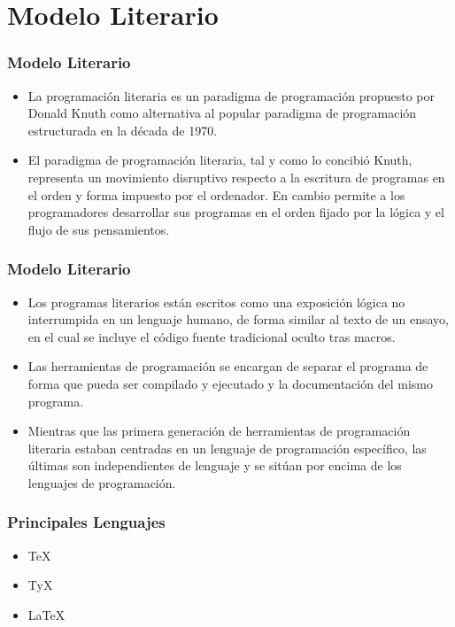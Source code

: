 \documentclass[aspectratio=43]{beamer}%
\begin{document}
\section{Modelo Literario}
\begin{frame}[fragile]
\frametitle{\textbf{Modelo Literario}}
\justifying
 \begin{itemize}\justifying
  \item La programación literaria es un paradigma de programación propuesto por Donald Knuth como alternativa al popular paradigma de programación estructurada en la década de 1970.
  \item El paradigma de programación literaria, tal y como lo concibió Knuth, representa un movimiento disruptivo respecto a la escritura de programas en el orden y forma impuesto por el ordenador. En cambio permite a los programadores desarrollar sus programas en el orden fijado por la lógica y el flujo de sus pensamientos.
\end{itemize}
\end{frame}


\begin{frame}[fragile]
\frametitle{\textbf{Modelo Literario}}
\justifying
\begin{itemize}\justifying
  \item  Los programas literarios están escritos como una exposición lógica no interrumpida en un lenguaje humano, de forma similar al texto de un ensayo, en el cual se incluye el código fuente tradicional oculto tras macros. 
  \item Las herramientas de programación se encargan de separar el programa de forma que pueda ser compilado y ejecutado y la documentación del mismo programa. 
  \item Mientras que las primera generación de herramientas de programación literaria estaban centradas en un lenguaje de programación específico, las últimas son independientes de lenguaje y se sitúan por encima de los lenguajes de programación.
\end{itemize}


\end{frame}

\begin{frame}[fragile]
\frametitle{\textbf{Principales Lenguajes}}
\justifying
 \begin{itemize}\justifying
  \item \TeX{}
  \item TyX
  \item \LaTeX{}
\end{itemize}

\end{frame}
\end{document}
